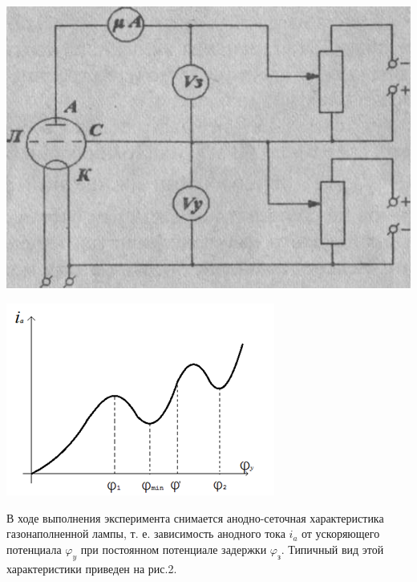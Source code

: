 \begin{center}
    \begin{minipage}[t]{0.49\linewidth}
        \includegraphics[width=\linewidth]{R1.png} 
        \label{fig:1}
        \vspace{-32pt}
    \end{minipage}
    \begin{minipage}[t]{0.49\linewidth}
        \includegraphics[width=\linewidth]{1.jpg} 
        \label{fig:2}
        \vspace{-32pt}
    \end{minipage}
\end{center}

В ходе выполнения эксперимента снимается анодно-сеточная характеристика газонаполненной лампы, т. е. зависимость анодного 
тока $i_a$ от ускоряющего потенциала $\varphi_{y}$ при постоянном потенциале задержки $\varphi_{з}$. Типичный вид этой характеристики приведен на рис.2.

